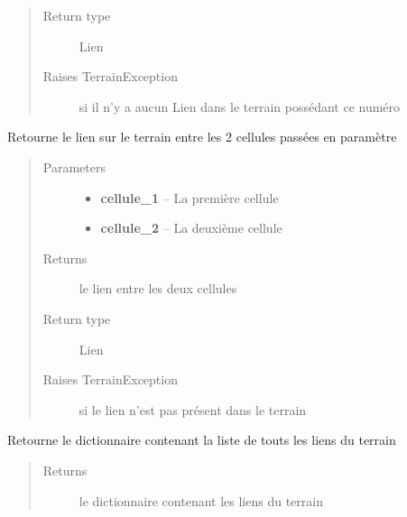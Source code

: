\documentclass[letterpaper,10pt,english]{sphinxmanual}
\begin{document}
\begin{fulllineitems}
\begin{fulllineitems}
\begin{quote}
\begin{description}
\item[{Return type}] \leavevmode
Lien

\item[{Raises TerrainException}] \leavevmode
si il n'y a aucun Lien dans le terrain possédant ce numéro

\end{description}\end{quote}

\end{fulllineitems}


\begin{fulllineitems}
\label{index:Terrain.Terrain.getLienEntreCellules}
Retourne le lien sur le terrain entre les 2 cellules passées en paramètre
\begin{quote}\begin{description}
\item[{Parameters}] \leavevmode\begin{itemize}
\item {} 
\textbf{cellule\_1} -- La première cellule

\item {} 
\textbf{cellule\_2} -- La deuxième cellule

\end{itemize}

\item[{Returns}] \leavevmode
le lien entre les deux cellules

\item[{Return type}] \leavevmode
Lien

\item[{Raises TerrainException}] \leavevmode
si le lien n'est pas présent dans le terrain

\end{description}\end{quote}

\end{fulllineitems}


\begin{fulllineitems}
\label{index:Terrain.Terrain.getLiens}
Retourne le dictionnaire contenant la liste de touts les liens du terrain
\begin{quote}\begin{description}
\item[{Returns}] \leavevmode
le dictionnaire contenant les liens du terrain


\end{description}
\end{quote}
\end{fulllineitems}
\end{fulllineitems}
\end{document}
